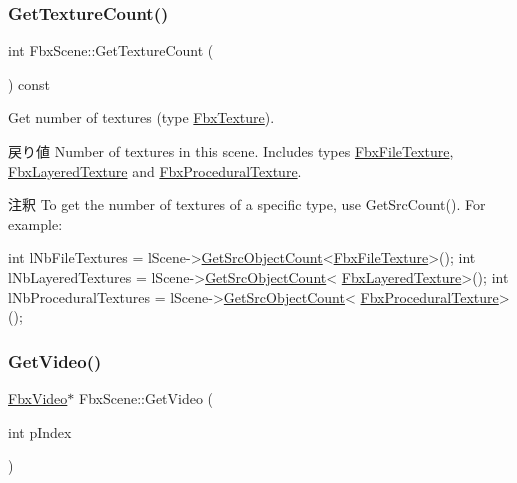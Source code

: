 \subsubsection{\texorpdfstring{Get\+Texture\+Count()}{GetTextureCount()}}
{\footnotesize\ttfamily int Fbx\+Scene\+::\+Get\+Texture\+Count (\begin{DoxyParamCaption}{ }\end{DoxyParamCaption}) const}

Get number of textures (type \hyperlink{class_fbx_texture}{Fbx\+Texture}). \begin{DoxyReturn}{戻り値}
Number of textures in this scene. Includes types \hyperlink{class_fbx_file_texture}{Fbx\+File\+Texture}, \hyperlink{class_fbx_layered_texture}{Fbx\+Layered\+Texture} and \hyperlink{class_fbx_procedural_texture}{Fbx\+Procedural\+Texture}. 
\end{DoxyReturn}
\begin{DoxyRemark}{注釈}
To get the number of textures of a specific type, use Get\+Src\+Count(). For example\+: 
\begin{DoxyCode}
\textcolor{keywordtype}{int} lNbFileTextures = lScene->\hyperlink{class_fbx_object_a5fce56e85d5e0568243a5df99dabb42f}{GetSrcObjectCount}<\hyperlink{class_fbx_file_texture}{FbxFileTexture}>();
\textcolor{keywordtype}{int} lNbLayeredTextures = lScene->\hyperlink{class_fbx_object_a5fce56e85d5e0568243a5df99dabb42f}{GetSrcObjectCount}<
      \hyperlink{class_fbx_layered_texture}{FbxLayeredTexture}>();
\textcolor{keywordtype}{int} lNbProceduralTextures = lScene->\hyperlink{class_fbx_object_a5fce56e85d5e0568243a5df99dabb42f}{GetSrcObjectCount}<
      \hyperlink{class_fbx_procedural_texture}{FbxProceduralTexture}>();
\end{DoxyCode}
 
\end{DoxyRemark}
\mbox{\label{class_fbx_scene_ae5365932948e9fe88b2323669a92d114}} 
\subsubsection{\texorpdfstring{Get\+Video()}{GetVideo()}}
{\footnotesize\ttfamily \hyperlink{class_fbx_video}{Fbx\+Video}$\ast$ Fbx\+Scene\+::\+Get\+Video (\begin{DoxyParamCaption}\item[{int}]{p\+Index }\end{DoxyParamCaption})}

